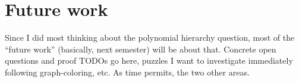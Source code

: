 \chapter{Future work}

\label{ch:future}

Since I did most thinking about the polynomial hierarchy question, most of the
``future work'' (basically, next semester) will be about that.  Concrete open
questions and proof TODOs go here, puzzles I want to investigate immediately
following graph-coloring, etc.  As time permits, the two other areas.
